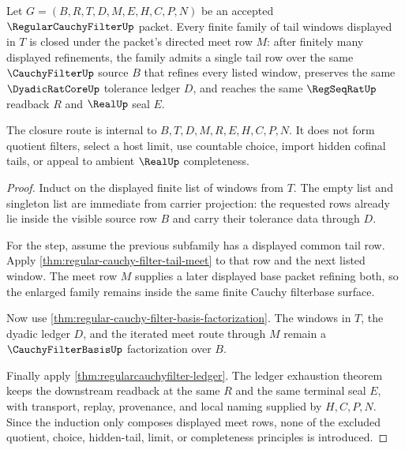 \begin{theorem}
\label{thm:regular-cauchy-filter-directed-tail-closure}
Let $G=(B,R,T,D,M,E,H,C,P,N)$ be an accepted $\RegularCauchyFilterUp$ packet. Every finite family of tail windows displayed in $T$ is closed under the packet's directed meet row $M$: after finitely many displayed refinements, the family admits a single tail row over the same $\CauchyFilterUp$ source $B$ that refines every listed window, preserves the same $\DyadicRatCoreUp$ tolerance ledger $D$, and reaches the same $\RegSeqRatUp$ readback $R$ and $\RealUp$ seal $E$.

The closure route is internal to $B,T,D,M,R,E,H,C,P,N$. It does not form quotient filters, select a host limit, use countable choice, import hidden cofinal tails, or appeal to ambient $\RealUp$ completeness.
\end{theorem}
\begin{proof}
Induct on the displayed finite list of windows from $T$. The empty list and singleton list are immediate from carrier projection: the requested rows already lie inside the visible source row $B$ and carry their tolerance data through $D$.

For the step, assume the previous subfamily has a displayed common tail row. Apply \autoref{thm:regular-cauchy-filter-tail-meet} to that row and the next listed window. The meet row $M$ supplies a later displayed base packet refining both, so the enlarged family remains inside the same finite Cauchy filterbase surface.

Now use \autoref{thm:regular-cauchy-filter-basis-factorization}. The windows in $T$, the dyadic ledger $D$, and the iterated meet route through $M$ remain a $\CauchyFilterBasisUp$ factorization over $B$.

Finally apply \autoref{thm:regularcauchyfilter-ledger}. The ledger exhaustion theorem keeps the downstream readback at the same $R$ and the same terminal seal $E$, with transport, replay, provenance, and local naming supplied by $H,C,P,N$. Since the induction only composes displayed meet rows, none of the excluded quotient, choice, hidden-tail, limit, or completeness principles is introduced.
\end{proof}

